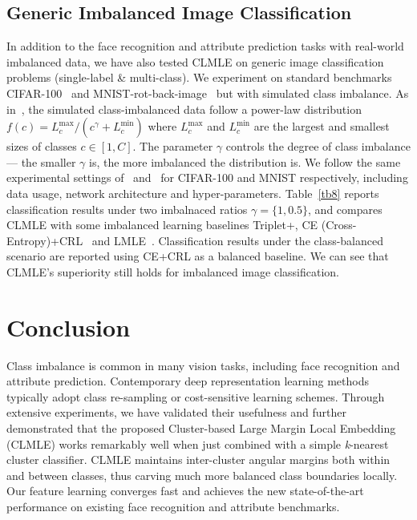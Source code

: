 \documentclass[10pt,journal,compsoc]{IEEEtran}
\begin{document}
\subsection{Generic Imbalanced Image Classification}

In addition to the face recognition and attribute prediction tasks with real-world imbalanced data, we have also tested CLMLE on generic image classification problems (single-label \& multi-class). We experiment on standard benchmarks CIFAR-100~\cite{Krizhevsky09} and MNIST-rot-back-image~\cite{Larochelle07} but with simulated class imbalance. As in~\cite{Dong_2017_ICCV}, the simulated class-imbalanced data follow a power-law distribution $f(c)=L_c^{\max}/(c^{\gamma}+L_c^{\min})$ where $L_c^{\max}$ and $L_c^{\min}$ are the largest and smallest sizes of classes $c\in[1,C]$. The parameter $\gamma$ controls the degree of class imbalance --- the smaller $\gamma$ is, the more imbalanced the distribution is. We follow the same experimental settings of~\cite{Dong_2017_ICCV} and~\cite{huang2016lmle} for CIFAR-100 and MNIST respectively, including data usage, network architecture and hyper-parameters. Table~\ref{tb8} reports classification results under two imbalnaced ratios $\gamma=\{1,0.5\}$, and compares CLMLE with some imbalanced learning baselines Triplet+, CE (Cross-Entropy)+CRL~\cite{Dong_2017_ICCV} and LMLE~\cite{huang2016lmle}. Classification results under the class-balanced scenario are reported using CE+CRL as a balanced baseline. We can see that CLMLE's superiority still holds for imbalanced image classification.

\section{Conclusion}
Class imbalance is common in many vision tasks, including face recognition and attribute prediction. Contemporary deep representation learning methods typically adopt class re-sampling or cost-sensitive learning schemes. Through extensive experiments, we have validated their usefulness and further demonstrated that the proposed Cluster-based Large Margin Local Embedding (CLMLE) works remarkably well when just combined with a simple \textit{k}-nearest cluster classifier. CLMLE maintains inter-cluster angular margins both within and between classes, thus carving much more balanced class boundaries locally. Our feature learning converges fast and achieves the new state-of-the-art performance on existing face recognition and attribute benchmarks.
\end{document}
